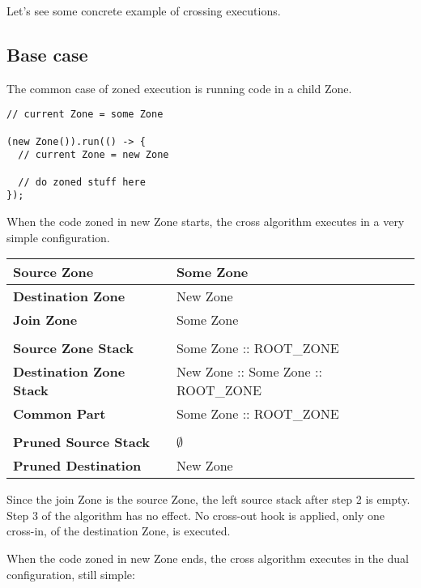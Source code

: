 Let's see some concrete example of crossing executions.

\subsection*{Base case}

The common case of zoned execution is running code in a child Zone.

\begin{lstlisting}
// current Zone = some Zone

(new Zone()).run(() -> {
  // current Zone = new Zone

  // do zoned stuff here
});
\end{lstlisting}

When the code zoned in new Zone starts, the cross algorithm executes in a very simple configuration.

\begin{tabular}{| l | l |}
\hline
\textbf{Source Zone} & Some Zone
\\ \hline
\textbf{Destination Zone} & New Zone
\\ \hline
\textbf{Join Zone} & Some Zone
\\ \hline
\multicolumn{2}{l}{}
\\ \hline
\textbf{Source Zone Stack} & Some Zone :: ROOT\_ZONE
\\ \hline
\textbf{Destination Zone Stack } & New Zone :: Some Zone :: ROOT\_ZONE
\\ \hline
\textbf{Common Part} & Some Zone :: ROOT\_ZONE
\\ \hline
\multicolumn{2}{l}{}
\\ \hline
\textbf{Pruned Source Stack} & $\emptyset$
\\ \hline
\textbf{Pruned Destination } & New Zone
\\ \hline
\end{tabular}

Since the join Zone is the source Zone, the left source stack after step 2 is empty. Step 3 of the algorithm has no effect. No cross-out hook is applied, only one cross-in, of the destination Zone, is executed.

When the code zoned in new Zone ends, the cross algorithm executes in the dual configuration, still simple:

